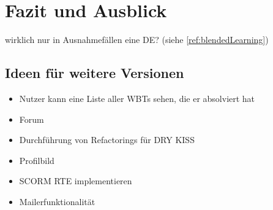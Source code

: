 \chapter{Fazit und Ausblick}\label{ref:chaptSummary}
\begin{k}
wirklich nur in Ausnahmefällen eine DE? (siehe \ref{ref:blendedLearning})
\end{k}
\section{Ideen für weitere Versionen}
\begin{k}
\begin{itemize}
  \item Nutzer kann eine Liste aller WBTs sehen, die er absolviert hat
  \item Forum
  \item Durchführung von Refactorings für DRY KISS
  \item Profilbild
  \item SCORM RTE implementieren
  \item Mailerfunktionalität
\end{itemize}
\end{k}